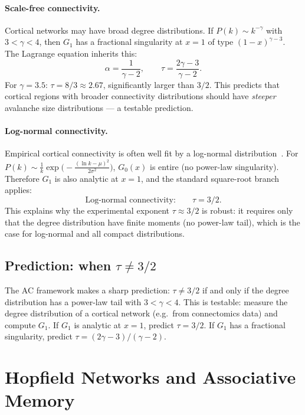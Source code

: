 \documentclass[11pt,a4paper]{article}
\theoremstyle{definition}
\begin{document}
\paragraph{Scale-free connectivity.}
Cortical networks may have broad degree distributions. If
$P(k) \sim k^{-\gamma}$ with $3 < \gamma < 4$, then $G_1$ has a
fractional singularity at $x = 1$ of type $(1-x)^{\gamma - 3}$.
The Lagrange equation inherits this:
\begin{equation}
\alpha = \frac{1}{\gamma - 2}, \qquad
\tau = \frac{2\gamma - 3}{\gamma - 2}.
\end{equation}
For $\gamma = 3.5$: $\tau = 8/3 \approx 2.67$, significantly larger
than $3/2$. This predicts that cortical regions with broader
connectivity distributions should have \emph{steeper} avalanche size
distributions --- a testable prediction.

\paragraph{Log-normal connectivity.}
Empirical cortical connectivity is often well fit by a log-normal
distribution~\cite{buzsaki2014}. For $P(k) \sim
\frac{1}{k}\exp\bigl(-\frac{(\ln k - \mu)^2}{2\sigma^2}\bigr)$,
$G_0(x)$ is entire (no power-law singularity). Therefore $G_1$ is
also analytic at $x = 1$, and the standard square-root branch applies:
\begin{equation}
\text{Log-normal connectivity:} \qquad \tau = 3/2.
\end{equation}
This explains why the experimental exponent $\tau \approx 3/2$ is
robust: it requires only that the degree distribution have finite
moments (no power-law tail), which is the case for log-normal and
all compact distributions.

\subsection{Prediction: when $\tau \neq 3/2$}

The AC framework makes a sharp prediction: $\tau \neq 3/2$ if and
only if the degree distribution has a power-law tail with $3 < \gamma < 4$.
This is testable: measure the degree distribution of a cortical
network (e.g.\ from connectomics data) and compute $G_1$. If $G_1$ is
analytic at $x = 1$, predict $\tau = 3/2$. If $G_1$ has a fractional
singularity, predict $\tau = (2\gamma - 3)/(\gamma - 2)$.


\section{Hopfield Networks and Associative Memory}
\label{sec:hopfield}
\end{document}
